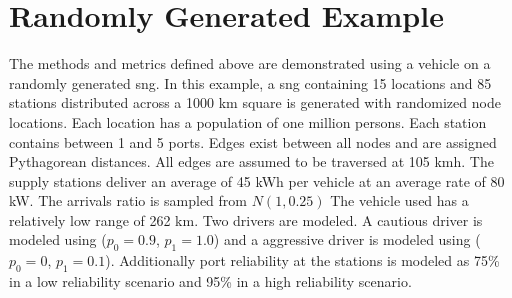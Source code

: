 \section*{Randomly Generated Example}

The methods and metrics defined above are demonstrated using a vehicle on a randomly generated \gls{sng}. In this example, a \gls{sng} containing 15 locations and 85 stations distributed across a 1000 km square is generated with randomized node locations. Each location has a population of one million persons. Each station contains between 1 and 5 ports. Edges exist between all nodes and are assigned Pythagorean distances. All edges are assumed to be traversed at 105 kmh. The supply stations deliver an average of 45 kWh per vehicle at an average rate of 80 kW. The arrivals ratio is sampled from $N(1, 0.25)$ The vehicle used has a relatively low range of 262 km. Two drivers are modeled. A cautious driver is modeled using ($p_0 = 0.9$, $p_1 = 1.0$) and a aggressive driver is modeled using ($p_0 = 0$, $p_1 = 0.1$). Additionally port reliability at the stations is modeled as 75\% in a low reliability scenario and 95\% in a high reliability scenario.

